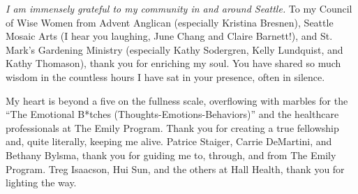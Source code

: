 \textit{I am immensely grateful to my community in and around Seattle.} To my
Council of Wise Women from Advent Anglican (especially Kristina Bresnen),
Seattle Mosaic Arts (I hear you laughing, June Chang and Claire Barnett!), and
St. Mark's Gardening Ministry (especially Kathy Sodergren, Kelly Lundquist,
and Kathy Thomason), thank you for enriching my soul. You have shared so much wisdom
in the countless hours I have sat in your presence, often in silence.

My heart is beyond a five on the fullness scale, overflowing with marbles for the
``The Emotional B*tches (Thoughts-Emotions-Behaviors)'' and the healthcare
professionals at The Emily Program. 
Thank you for creating a true fellowship and, quite literally, keeping me alive.
Patrice Staiger, Carrie DeMartini, and Bethany Bylsma, thank you for guiding me
to, through, and from The Emily Program. Treg Isaacson, Hui Sun, and the others 
at Hall Health, thank you for lighting the way.

